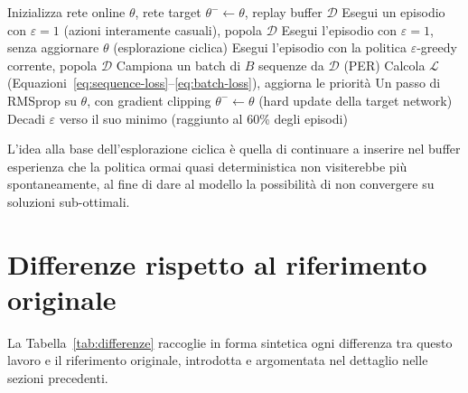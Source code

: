 \begin{algorithm}[htbp]
  \caption{Ciclo di addestramento (per modello)}
  \label{alg:training-loop}
  \begin{algorithmic}[1]
    \State Inizializza rete online $\theta$, rete target $\theta^- \gets \theta$, replay buffer $\mathcal{D}$
    \State Esegui un episodio con $\varepsilon = 1$ (azioni interamente casuali), popola $\mathcal{D}$
    \EndFor
    \State Esegui l'episodio con $\varepsilon = 1$, senza aggiornare $\theta$ (esplorazione ciclica)
    \Else
    \State Esegui l'episodio con la politica $\varepsilon$-greedy corrente, popola $\mathcal{D}$
    \State Campiona un batch di $B$ sequenze da $\mathcal{D}$ (PER)
    \State Calcola $\mathcal{L}$ (Equazioni~\ref{eq:sequence-loss}--\ref{eq:batch-loss}), aggiorna le priorità
    \State Un passo di RMSprop su $\theta$, con gradient clipping
    \State $\theta^- \gets \theta$ (hard update della target network)
    \EndIf
    \EndFor
    \State Decadi $\varepsilon$ verso il suo minimo (raggiunto al 60\% degli episodi)
    \EndIf
    \EndFor
  \end{algorithmic}
\end{algorithm}

L'idea alla base dell'esplorazione ciclica è quella di continuare a
inserire nel buffer esperienza che la politica ormai quasi deterministica
non visiterebbe più spontaneamente, al fine di dare al modello la
possibilità di non convergere su soluzioni sub-ottimali.

\section{Differenze rispetto al riferimento originale}
\label{subsec:framing-pro}

La Tabella~\ref{tab:differenze} raccoglie in forma sintetica ogni
differenza tra questo lavoro e il riferimento originale, introdotta e
argomentata nel dettaglio nelle sezioni precedenti.

